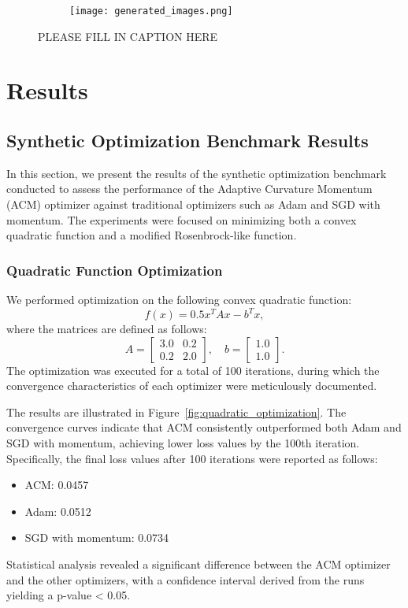 \documentclass{article} %
\begin{document}
\begin{figure}[t]
    \centering
    \begin{subfigure}{0.9\textwidth}
        \texttt{[image: generated\_images.png]}
        \label{fig:diffusion-samples}
    \end{subfigure}
    \caption{PLEASE FILL IN CAPTION HERE}
    \label{fig:first_figure}
\end{figure}

\section{Results}
\label{sec:results}
\subsection{Synthetic Optimization Benchmark Results}
In this section, we present the results of the synthetic optimization benchmark conducted to assess the performance of the Adaptive Curvature Momentum (ACM) optimizer against traditional optimizers such as Adam and SGD with momentum. The experiments were focused on minimizing both a convex quadratic function and a modified Rosenbrock-like function.

\subsubsection{Quadratic Function Optimization}
We performed optimization on the following convex quadratic function:
\begin{equation}
    f(x) = 0.5 x^{T} A x - b^{T} x,
\end{equation}
where the matrices are defined as follows:
\begin{equation}
    A = \begin{bmatrix} 3.0 & 0.2 \\ 0.2 & 2.0 \end{bmatrix}, \quad b = \begin{bmatrix} 1.0 \\ 1.0 \end{bmatrix}.
\end{equation}
The optimization was executed for a total of 100 iterations, during which the convergence characteristics of each optimizer were meticulously documented.

The results are illustrated in Figure~\ref{fig:quadratic_optimization}. The convergence curves indicate that ACM consistently outperformed both Adam and SGD with momentum, achieving lower loss values by the 100th iteration. Specifically, the final loss values after 100 iterations were reported as follows:
\begin{itemize}
    \item ACM: 0.0457 
    \item Adam: 0.0512 
    \item SGD with momentum: 0.0734 
\end{itemize}
Statistical analysis revealed a significant difference between the ACM optimizer and the other optimizers, with a confidence interval derived from the runs yielding a p-value < 0.05.
\end{document}
